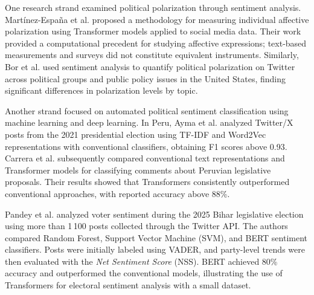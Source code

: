 \documentclass[conference, letterpaper]{IEEEtran}
\begin{document}
One research strand examined political polarization through sentiment analysis. Martínez-España et al. \cite{polariz} proposed a methodology for measuring individual affective polarization using Transformer models applied to social media data. Their work provided a computational precedent for studying affective expressions; text-based measurements and surveys did not constitute equivalent instruments. Similarly, Bor et al. \cite{bor2023} used sentiment analysis to quantify political polarization on Twitter across political groups and public policy issues in the United States, finding significant differences in polarization levels by topic.

Another strand focused on automated political sentiment classification using machine learning and deep learning. In Peru, Ayma et al. \cite{Ayma2024} analyzed Twitter/X posts from the 2021 presidential election using TF-IDF and Word2Vec representations with conventional classifiers, obtaining F1 scores above 0.93. Carrera et al. \cite{Carrera2026} subsequently compared conventional text representations and Transformer models for classifying comments about Peruvian legislative proposals. Their results showed that Transformers consistently outperformed conventional approaches, with reported accuracy above 88\%.

Pandey et al. \cite{pandey2025twitter} analyzed voter sentiment during the 2025 Bihar legislative election using more than 1\,100 posts collected through the Twitter API. The authors compared Random Forest, Support Vector Machine (SVM), and BERT sentiment classifiers. Posts were initially labeled using VADER, and party-level trends were then evaluated with the \textit{Net Sentiment Score} (NSS). BERT achieved 80\% accuracy and outperformed the conventional models, illustrating the use of Transformers for electoral sentiment analysis with a small dataset.

\end{document}
